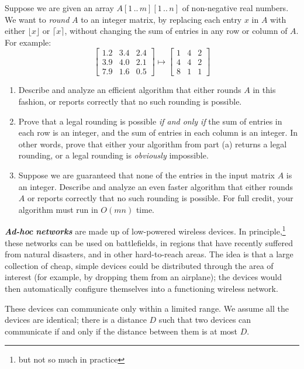 \begin{exercises}
\item
\label{ex:11.16}
Suppose we are given an array $A[1\,..\,m][1\,..\,n]$ of non-negative real numbers.
We want to \textit{round} $A$ to an integer matrix, by replacing each entry $x$ in $A$ with either $\lfloor x \rfloor$ or $\lceil x \rceil$, without changing the sum of entries in any row or column of $A$.
For example:
\[
\begin{bmatrix}
1.2 & 3.4 & 2.4\\
3.9 & 4.0 & 2.1\\
7.9 & 1.6 & 0.5
\end{bmatrix}
\longmapsto
\begin{bmatrix}
1 & 4 & 2\\
4 & 4 & 2\\
8 & 1 & 1
\end{bmatrix}
\]
\begin{enumerate}
\item Describe and analyze an efficient algorithm that either rounds $A$ in this fashion, or reports correctly that no such rounding is possible.
\item Prove that a legal rounding is possible \textit{if and only if} the sum of entries in each row is an integer, and the sum of entries in each column is an integer.
In other words, prove that either your algorithm from part (a) returns a legal rounding, or a legal rounding is \textit{obviously} impossible.
\item {} Suppose we are guaranteed that none of the entries in the input matrix $A$ is an integer.
Describe and analyze an even faster algorithm that either rounds $A$ or reports correctly that no such rounding is possible.
For full credit, your algorithm must run in $O(mn)$ time.
\end{enumerate}

\item
\label{ex:11.17}
\textbf{\textit{Ad-hoc}} \textbf{\textit{networks}} are made up of low-powered wireless devices.
In principle,\footnote{but not so much in practice} these networks can be used on battlefields, in regions that have recently suffered from natural disasters, and in other hard-to-reach areas.
The idea is that a large collection of cheap, simple devices could be distributed through the area of interest (for example, by dropping them from an airplane); the devices would then automatically configure themselves into a functioning wireless network.

These devices can communicate only within a limited range.
We assume all the devices are identical; there is a distance $D$ such that two devices can communicate if and only if the distance between them is at most $D$.


\end{exercises}
